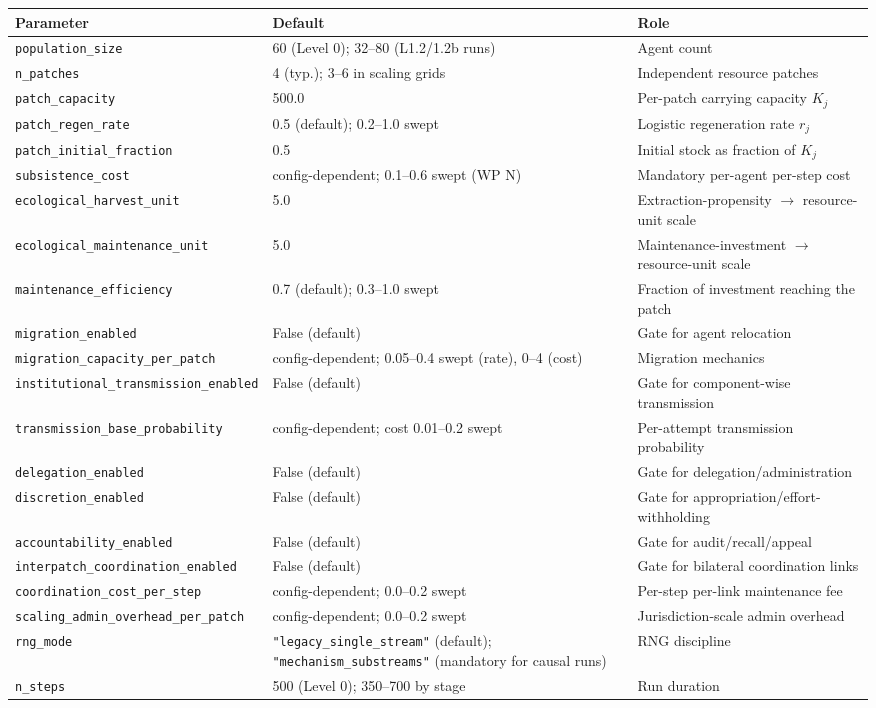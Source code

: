 \begin{tabular}{@{}p{}p{}p{}@{}}
\toprule
\textbf{Parameter} & \textbf{Default} & \textbf{Role} \\
\midrule
\texttt{population\_size} & 60 (Level 0); 32--80 (L1.2/1.2b runs) & Agent count \\
\texttt{n\_patches} & 4 (typ.); 3--6 in scaling grids & Independent resource patches \\
\texttt{patch\_capacity} & 500.0 & Per-patch carrying capacity $K_j$ \\
\texttt{patch\_regen\_rate} & 0.5 (default); 0.2--1.0 swept & Logistic regeneration rate $r_j$ \\
\texttt{patch\_initial\_fraction} & 0.5 & Initial stock as fraction of $K_j$ \\
\texttt{subsistence\_cost} & config-dependent; 0.1--0.6 swept (WP N) & Mandatory per-agent per-step cost \\
\texttt{ecological\_harvest\_unit} & 5.0 & Extraction-propensity $\to$ resource-unit scale \\
\texttt{ecological\_maintenance\_unit} & 5.0 & Maintenance-investment $\to$ resource-unit scale \\
\texttt{maintenance\_efficiency} & 0.7 (default); 0.3--1.0 swept & Fraction of investment reaching the patch \\
\texttt{migration\_enabled} & False (default) & Gate for agent relocation \\
\texttt{migration\_capacity\_per\_patch} & config-dependent; 0.05--0.4 swept (rate), 0--4 (cost) & Migration mechanics \\
\texttt{institutional\_transmission\_enabled} & False (default) & Gate for component-wise transmission \\
\texttt{transmission\_base\_probability} & config-dependent; cost 0.01--0.2 swept & Per-attempt transmission probability \\
\texttt{delegation\_enabled} & False (default) & Gate for delegation/administration \\
\texttt{discretion\_enabled} & False (default) & Gate for appropriation/effort-withholding \\
\texttt{accountability\_enabled} & False (default) & Gate for audit/recall/appeal \\
\texttt{interpatch\_coordination\_enabled} & False (default) & Gate for bilateral coordination links \\
\texttt{coordination\_cost\_per\_step} & config-dependent; 0.0--0.2 swept & Per-step per-link maintenance fee \\
\texttt{scaling\_admin\_overhead\_per\_patch} & config-dependent; 0.0--0.2 swept & Jurisdiction-scale admin overhead \\
\texttt{rng\_mode} & \texttt{"legacy\_single\_stream"} (default); \texttt{"mechanism\_substreams"} (mandatory for causal runs) & RNG discipline \\
\texttt{n\_steps} & 500 (Level 0); 350--700 by stage & Run duration \\
\bottomrule
\end{tabular}
